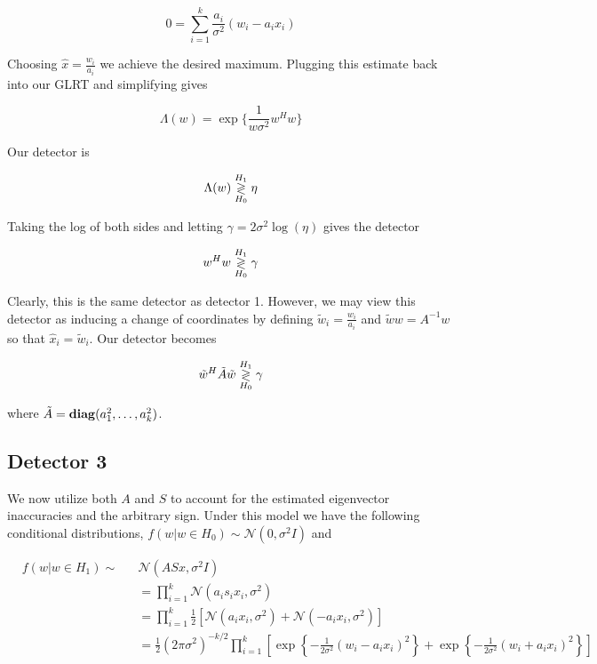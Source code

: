 \documentclass[english]{article}
\begin{document}
\begin{equation}
0=\sum_{i=1}^k\frac{a_i}{\sigma^2}\left(w_i-a_ix_i\right)
\end{equation}

Choosing $\hat{x} = \frac{w_i}{a_i}$ we achieve the desired maximum. Plugging this estimate back into our GLRT and simplifying gives

\begin{equation}
\Lambda(w)=\exp\{\frac{1}{w\sigma^2}w^Hw\}
\end{equation}

Our detector is

\begin{equation}
\Lambda(w) \overset{H_1}{\underset{H_0}{\gtrless}} \eta
\end{equation}

Taking the log of both sides and letting $\gamma = 2\sigma^2\log(\eta)$ gives the detector

\begin{equation}
w^Hw \overset{H_1}{\underset{H_0}{\gtrless}}\gamma
\end{equation}

Clearly, this is the same detector as detector 1. However, we may view this detector as inducing a change of coordinates by defining $\tilde{w}_i = \frac{w_i}{a_i}$ and $\tilde{w}w=A^{-1}w$ so that $\hat{x}_i = \tilde{w}_i$. Our detector becomes

\begin{equation}
\tilde{w}^H\tilde{A}\tilde{w}\overset{H_1}{\underset{H_0}{\gtrless}}\gamma
\end{equation}

where $\tilde{A}=\mathop{\bf diag}(a_1^2,\dots,a_k^2)$.

\subsection{Detector 3}
We now utilize both $A$ and $S$ to account for the estimated eigenvector inaccuracies and the arbitrary sign. Under this model we have the following conditional distributions, $f(w|w\in H_0)\sim\mathcal{N}(0,\sigma^2I)$ and

\begin{equation}
\begin{aligned}
&f(w|w\in H_1)\sim
&&\mathcal{N}(ASx,\sigma^2I)\\
&&&=\prod_{i=1}^k\mathcal{N}(a_is_ix_i,\sigma^2)\\
&&&=\prod_{i=1}^k\frac{1}{2}\left[\mathcal{N}(a_ix_i,\sigma^2) + \mathcal{N}(-a_ix_i,\sigma^2)\right]\\
&&&=\frac{1}{2}\left(2\pi\sigma^2\right)^{-k/2}\prod_{i=1}^k\left[\exp\left\{-\frac{1}{2\sigma^2}\left(w_i-a_ix_i\right)^2\right\}+\exp\left\{-\frac{1}{2\sigma^2}\left(w_i+a_ix_i\right)^2\right\}\right]
\end{aligned}
\end{equation}
\end{document}
